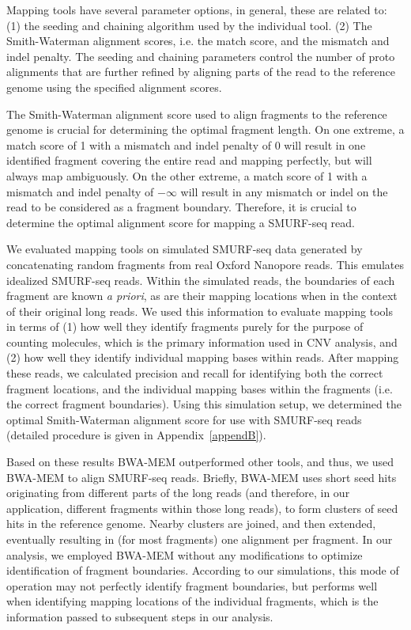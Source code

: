 Mapping tools have several parameter options, in general, these are
related to: (1) the seeding and chaining algorithm used by the
individual tool.  (2) The Smith-Waterman alignment scores, i.e. the
match score, and the mismatch and indel penalty. The seeding and
chaining parameters control the number of proto alignments that are
further refined by aligning parts of the read to the reference genome
using the specified alignment scores.

The Smith-Waterman alignment score used to align fragments to the
reference genome is crucial for determining the optimal fragment length.
On one extreme, a match score of 1 with a mismatch and indel penalty of
0 will result in one identified fragment covering the entire read and
mapping perfectly, but will always map ambiguously. On the other
extreme, a match score of 1 with a mismatch and indel penalty of
$-\infty$ will result in any mismatch or indel on the read to be
considered as a fragment boundary. Therefore, it is crucial to determine
the optimal alignment score for mapping a SMURF-seq read.

We evaluated mapping tools on simulated SMURF-seq data generated by
concatenating random fragments from real Oxford Nanopore reads. This
emulates idealized SMURF-seq reads. Within the simulated reads, the
boundaries of each fragment are known \textit{a priori}, as are their
mapping locations when in the context of their original long reads. We
used this information to evaluate mapping tools in terms of (1) how well
they identify fragments purely for the purpose of counting molecules,
which is the primary information used in CNV analysis, and (2) how well
they identify individual mapping bases within reads. After mapping these
reads, we calculated precision and recall for identifying both the
correct fragment locations, and the individual mapping bases within the
fragments (i.e. the correct fragment boundaries). Using this simulation
setup, we determined the optimal Smith-Waterman alignment score for use
with SMURF-seq reads (detailed procedure is given in
Appendix~\ref{appendB}).

Based on these results BWA-MEM outperformed other tools, and thus, we
used BWA-MEM to align SMURF-seq reads.
%
Briefly, BWA-MEM uses short seed hits originating from different parts of
the long reads (and therefore, in our application, different fragments
within those long reads), to form clusters of seed hits in the reference
genome. Nearby clusters are joined, and then extended, eventually
resulting in (for most fragments) one alignment per fragment.
%
In our analysis, we employed BWA-MEM without any modifications to
optimize identification of fragment boundaries.  According to our
simulations, this mode of operation may not perfectly identify fragment
boundaries, but performs well when identifying mapping locations of
the individual fragments, which is the information passed to subsequent
steps in our analysis.


